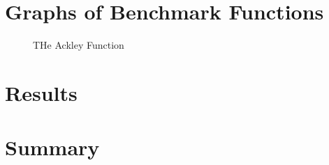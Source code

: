 \section{Graphs of Benchmark Functions}
\begin{figure}[c!]
	\centering
	\setlength \fboxsep{0pt}
	\setlength \fboxrule{0.5pt}
	\caption{THe Ackley Function}
	\label{fig:AckleyGraph}
\end{figure}
\section{Results}
\section{Summary}
